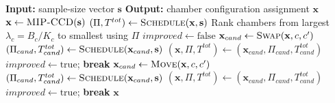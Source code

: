 \documentclass[11pt]{article}
\begin{document}
\begin{algorithm}[H]
\caption{\textsc{ChamberAssignment}()}
\label{alg:chamber_assignment}
\begin{algorithmic}[1]
\State \textbf{Input:} sample-size vector \(\mathbf{s}\)
\State \textbf{Output:} chamber configuration assignment \(\mathbf{x}\)
\State \(\mathbf{x}\leftarrow\Call{MIP-CCD}{\mathbf{s}}\) \label{step:ca-exact}
\State \((\Pi,T^{tot})\leftarrow\Call{Schedule}{\mathbf{x},\mathbf{s}}\) \label{step:ca-eval}
\Repeat
    \State Rank chambers from largest \(\lambda_c=B_c/K_c\) to smallest using \(\Pi\) \label{step:ca-rank}
    \State \(\mathit{improved}\leftarrow\mathrm{false}\)
        \State \(\mathbf{x}_{cand}\leftarrow\Call{Swap}{\mathbf{x},c,c'}\)  \label{step:ca-swap}
            \State \((\Pi_{cand},T^{tot}_{cand})\leftarrow\Call{Schedule}{\mathbf{x}_{cand},\mathbf{s}}\)
                \State \((\mathbf{x},\Pi,T^{tot})\leftarrow(\mathbf{x}_{cand},\Pi_{cand},T^{tot}_{cand})\) \label{step:ca-accept}
                \State \(\mathit{improved}\leftarrow\mathrm{true}\); \textbf{break}
            \EndIf
        \EndIf
    \EndFor
            \State \(\mathbf{x}_{cand}\leftarrow\Call{Move}{\mathbf{x},c,c'}\)  \label{step:ca-move}
                \State \((\Pi_{cand},T^{tot}_{cand})\leftarrow\Call{Schedule}{\mathbf{x}_{cand},\mathbf{s}}\)
                    \State \((\mathbf{x},\Pi,T^{tot})\leftarrow(\mathbf{x}_{cand},\Pi_{cand},T^{tot}_{cand})\)
                    \State \(\mathit{improved}\leftarrow\mathrm{true}\); \textbf{break}
                \EndIf
            \EndIf
        \EndFor
    \EndIf
{} \label{step:ca-stop}
\State \Return \(\mathbf{x}\)
\end{algorithmic}
\end{algorithm}
\end{document}
